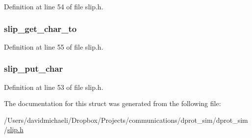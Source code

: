 Definition at line 54 of file slip.\-h.

\hypertarget{structslip__channel_a093b3751c0feac8a108cc2436939f03d}{
\subsubsection[{slip\-\_\-get\-\_\-char\-\_\-to}]{ slip\-\_\-get\-\_\-char\-\_\-to}}\label{structslip__channel_a093b3751c0feac8a108cc2436939f03d}


Definition at line 55 of file slip.\-h.

\hypertarget{structslip__channel_aa55cda0bc53118e4d95ae9667d08cf65}{
\subsubsection[{slip\-\_\-put\-\_\-char}]{ slip\-\_\-put\-\_\-char}}\label{structslip__channel_aa55cda0bc53118e4d95ae9667d08cf65}


Definition at line 53 of file slip.\-h.



The documentation for this struct was generated from the following file\-:\begin{DoxyCompactItemize}
\item 
/\-Users/davidmichaeli/\-Dropbox/\-Projects/communications/dprot\-\_\-sim/dprot\-\_\-sim/\hyperlink{slip_8h}{slip.\-h}\end{DoxyCompactItemize}

